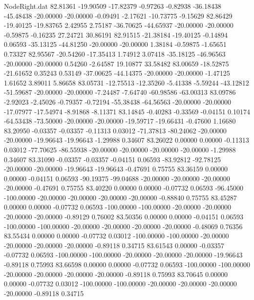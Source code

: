 \begin{filecontents}{NodeRight.dat}
  82.81361  -19.90509  -17.82379    -0.97263   -0.82938  -36.18438  -45.48438  -20.00000  -20.00000   -0.09491   -2.17621  -10.73775   -9.15629
  82.86429  -19.40125  -19.83765     2.42955    2.75187  -36.70625  -44.65937  -20.00000  -20.00000   -0.59875   -0.16235   27.24721   30.86191
  82.91515  -21.38184  -19.40125    -0.14894    0.06593  -35.13125  -44.81250  -20.00000  -20.00000    1.38184   -0.59875   -1.65651    0.73327
  82.95567  -20.54260  -17.35413     1.74912    3.07418  -35.18125  -46.96563  -20.00000  -20.00000    0.54260   -2.64587   19.10877   33.58482
  83.00659  -18.52875  -21.61652     0.35243    0.53149  -37.00625  -44.14375  -20.00000  -20.00000   -1.47125    1.61652    3.89011    5.86658
  83.05731  -12.75513  -12.35260    -5.41338   -5.59244  -43.12812  -51.59687  -20.00000  -20.00000   -7.24487   -7.64740  -60.98586  -63.00313
  83.09786   -2.92023   -2.45026    -0.79357   -0.72194  -55.38438  -64.56563  -20.00000  -20.00000  -17.07977  -17.54974   -8.91868   -8.11371
  83.14845   -0.40283   -0.33569    -0.04151    0.10174  -64.53438  -73.50000  -20.00000  -20.00000  -19.59717  -19.66431   -0.47600    1.16680
  83.20950   -0.03357   -0.03357    -0.11313    0.03012  -71.37813  -80.24062  -20.00000  -20.00000  -19.96643  -19.96643   -1.29988    0.34607
  83.26022    0.00000    0.00000    -0.11313    0.03012  -77.70625  -86.55938  -20.00000  -20.00000  -20.00000  -20.00000   -1.29988    0.34607
  83.31090   -0.03357   -0.03357    -0.04151    0.06593  -83.92812  -92.78125  -20.00000  -20.00000  -19.96643  -19.96643   -0.47691    0.75755
  83.36159    0.00000    0.00000    -0.04151    0.06593  -90.19375  -99.04688  -20.00000  -20.00000  -20.00000  -20.00000   -0.47691    0.75755
  83.40220    0.00000    0.00000    -0.07732    0.06593  -96.45000 -100.00000  -20.00000  -20.00000  -20.00000  -20.00000   -0.88840    0.75755
  83.45287    0.00000    0.00000    -0.07732    0.06593 -100.00000 -100.00000  -20.00000  -20.00000  -20.00000  -20.00000   -0.89129    0.76002
  83.50356    0.00000    0.00000    -0.04151    0.06593 -100.00000 -100.00000  -20.00000  -20.00000  -20.00000  -20.00000   -0.48069    0.76356
  83.55434    0.00000    0.00000    -0.07732    0.03012 -100.00000 -100.00000  -20.00000  -20.00000  -20.00000  -20.00000   -0.89118    0.34715
  83.61543    0.00000   -0.03357    -0.07732    0.06593 -100.00000 -100.00000  -20.00000  -20.00000  -20.00000  -19.96643   -0.89118    0.75993
  83.66598    0.00000    0.00000    -0.07732    0.06593 -100.00000 -100.00000  -20.00000  -20.00000  -20.00000  -20.00000   -0.89118    0.75993
  83.70645    0.00000    0.00000    -0.07732    0.03012 -100.00000 -100.00000  -20.00000  -20.00000  -20.00000  -20.00000   -0.89118    0.34715

\end{filecontents}

